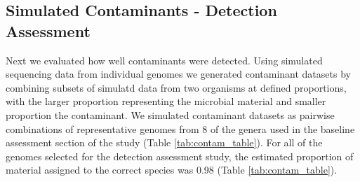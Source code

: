\documentclass[fleqn,10pt,lineno]{wlpeerj}\usepackage[]{graphicx}\usepackage[]{color}
\begin{document}
\subsection*{Simulated Contaminants - Detection Assessment}
\begin{table}[ht]
\centering
{}
\caption{Representative strains used in simulated contaminant datasets. Species indicates the proportion of the material assigned to the correct species. DNA size (Mb) and Genbank accession numbers (Acc) are indicated for chromosomes (C) and plasmids (P). Escherichia coli O157:H7 str. EC4115 and Yersinia pestis CO92 have two and three plasmids respectively.} 
\label{tab:contam_table}
\end{table}



Next we evaluated how well contaminants were detected.
Using simulated sequencing data from individual genomes we generated contaminant datasets by combining subsets of simulatd data from two organisms at defined proportions,
with the larger proportion representing the microbial material and smaller proportion the contaminant.
We simulated contaminant datasets as pairwise combinations of representative genomes from 8 of the genera used in the baseline assessment section of the study (Table \ref{tab:contam_table}).
For all of the genomes selected for the detection assessment study, the estimated proportion of material assigned to the correct species was 0.98 (Table \ref{tab:contam_table}).
\end{document}
